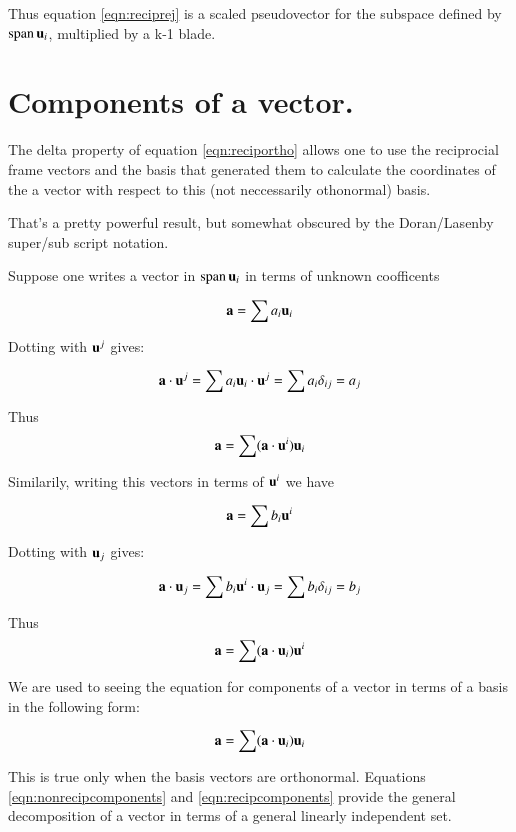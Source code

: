 \documentclass{article}      %
\begin{document}
Thus equation \ref{eqn:reciprej} is a scaled pseudovector for the subspace
defined by $\operatorname{span} {\mathbf{u}_i}$, multiplied by a k-1 blade.

\section{ Components of a vector. }

The delta property of 
equation \ref{eqn:reciportho} allows one to use the reciprocial frame
vectors and the basis that generated them to calculate the coordinates
of the a vector with respect to this (not neccessarily othonormal) basis.

That's a pretty powerful result, but somewhat obscured by the Doran/Lasenby
super/sub script notation.

Suppose one writes a vector in $\operatorname{span}{\mathbf{u}_i}$ in terms of unknown coofficents 

\[
\mathbf{a} = \sum a_i \mathbf{u}_i
\]

Dotting with $\mathbf{u}^j$ gives:

\[
\mathbf{a} \cdot \mathbf{u}^j 
= \sum a_i \mathbf{u}_i \cdot \mathbf{u}^j
= \sum a_i \delta_{ij}
= a_j
\]

Thus
\begin{equation}\label{eqn:nonrecipcomponents}
\mathbf{a} = \sum (\mathbf{a} \cdot \mathbf{u}^i) \mathbf{u}_i
\end{equation}

Similarily, writing this vectors in terms of $\mathbf{u}^i$ we have

\[
\mathbf{a} = \sum b_i \mathbf{u}^i
\]

Dotting with $\mathbf{u}_j$ gives:

\[
\mathbf{a} \cdot \mathbf{u}_j 
= \sum b_i \mathbf{u}^i \cdot \mathbf{u}_j
= \sum b_i \delta_{ij}
= b_j
\]

Thus
\begin{equation}\label{eqn:recipcomponents}
\mathbf{a} = \sum (\mathbf{a} \cdot \mathbf{u}_i) \mathbf{u}^i
\end{equation}

We are used to seeing the equation for components of a vector in terms of a
basis in the following form: 

\begin{equation}
\mathbf{a} = \sum (\mathbf{a} \cdot \mathbf{u}_i) \mathbf{u}_i
\end{equation}

This is true only when the basis vectors are orthonormal.
Equations
\ref{eqn:nonrecipcomponents} and \ref{eqn:recipcomponents} provide the
general decomposition of a vector in terms of a general linearly independent
set.
\end{document}
